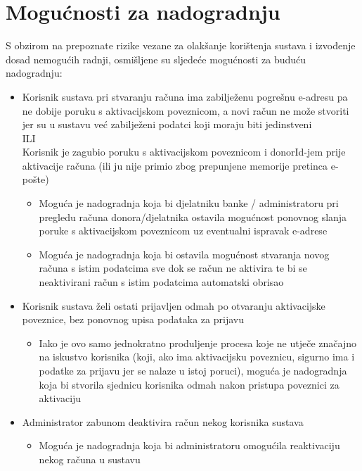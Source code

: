         \section{Mogućnosti za nadogradnju}
            \par{
            S obzirom na prepoznate rizike vezane za olakšanje korištenja sustava i izvođenje dosad nemogućih radnji, osmišljene su sljedeće mogućnosti za buduću nadogradnju:
            \begin{itemize}
            
                 \item Korisnik sustava pri stvaranju računa ima zabilježenu pogrešnu e-adresu pa ne dobije poruku s aktivacijskom poveznicom, a novi račun ne može stvoriti jer su u sustavu već zabilježeni podatci koji moraju biti jedinstveni 
                 \\ ILI
                \\ Korisnik je zagubio poruku s aktivacijskom poveznicom i donorId-jem prije aktivacije računa (ili ju nije primio zbog prepunjene memorije pretinca e-pošte)
                \begin{itemize}
                    \item Moguća je nadogradnja koja  bi djelatniku banke / administratoru pri pregledu računa donora/djelatnika ostavila mogućnost ponovnog slanja poruke s aktivacijskom poveznicom uz eventualni ispravak e-adrese
                    \item Moguća je nadogradnja koja bi ostavila mogućnost stvaranja novog računa s istim podatcima sve dok se račun ne aktivira te bi se neaktivirani račun s istim podatcima automatski obrisao
                \end{itemize}
                
                 \item Korisnik sustava želi ostati prijavljen odmah po otvaranju aktivacijske poveznice, bez ponovnog upisa podataka za prijavu
                \begin{itemize}
                    \item Iako je ovo samo jednokratno produljenje procesa koje ne utječe značajno na iskustvo korisnika (koji, ako ima aktivacijsku poveznicu, sigurno ima i podatke za prijavu jer se nalaze u istoj poruci), moguća je nadogradnja koja bi stvorila sjednicu korisnika odmah nakon pristupa poveznici za aktivaciju
                \end{itemize}
                
                 \item Administrator zabunom deaktivira račun nekog korisnika sustava
                \begin{itemize}
                    \item Moguća je nadogradnja koja bi administratoru omogućila reaktivaciju nekog računa u sustavu
                \end{itemize}
                

\end{itemize}}
